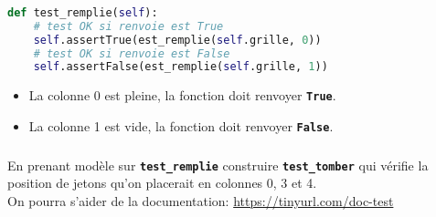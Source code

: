 \documentclass[svgnames,11pt]{beamer}
\begin{document}
\begin{frame}[fragile]
    \frametitle{}

    \begin{center}
        \begin{lstlisting}[language=Python , basicstyle=\ttfamily\small, xleftmargin=1em, xrightmargin=1em]
def test_remplie(self):
    # test OK si renvoie est True
    self.assertTrue(est_remplie(self.grille, 0))
    # test OK si renvoie est False
    self.assertFalse(est_remplie(self.grille, 1))
\end{lstlisting}
        \label{CODE}
    \end{center}

    \begin{aretenir}[Observations]
        \begin{itemize}
            \item La colonne 0 est pleine, la fonction doit renvoyer \textbf{\texttt{True}}.
            \item La colonne 1 est vide, la fonction doit renvoyer \textbf{\texttt{False}}.
        \end{itemize}
    \end{aretenir}
\end{frame}
\begin{frame}[fragile]
    \frametitle{}

    \begin{activite}
        En prenant modèle sur \textbf{\texttt{test\_remplie}} construire \textbf{\texttt{test\_tomber}} qui vérifie la position de jetons qu'on placerait en colonnes 0, 3 et 4.
        \\On pourra s'aider de la documentation: \url{https://tinyurl.com/doc-test}
    \end{activite}

    \begin{center}
    \end{center}
\end{frame}
\end{document}
